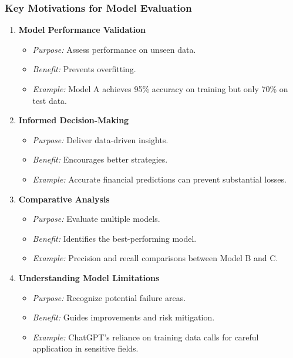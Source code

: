 \documentclass[aspectratio=169]{beamer}
\begin{document}
\begin{frame}[fragile]
    \frametitle{Key Motivations for Model Evaluation}
    \begin{enumerate}
        \item \textbf{Model Performance Validation}
        \begin{itemize}
            \item \textit{Purpose:} Assess performance on unseen data.
            \item \textit{Benefit:} Prevents overfitting.
            \item \textit{Example:} Model A achieves 95\% accuracy on training but only 70\% on test data.
        \end{itemize}
        
        \item \textbf{Informed Decision-Making}
        \begin{itemize}
            \item \textit{Purpose:} Deliver data-driven insights.
            \item \textit{Benefit:} Encourages better strategies.
            \item \textit{Example:} Accurate financial predictions can prevent substantial losses.
        \end{itemize}

        \item \textbf{Comparative Analysis}
        \begin{itemize}
            \item \textit{Purpose:} Evaluate multiple models.
            \item \textit{Benefit:} Identifies the best-performing model.
            \item \textit{Example:} Precision and recall comparisons between Model B and C.
        \end{itemize}

        \item \textbf{Understanding Model Limitations}
        \begin{itemize}
            \item \textit{Purpose:} Recognize potential failure areas.
            \item \textit{Benefit:} Guides improvements and risk mitigation.
            \item \textit{Example:} ChatGPT's reliance on training data calls for careful application in sensitive fields.
        \end{itemize}
    \end{enumerate}
\end{frame}
\end{document}
